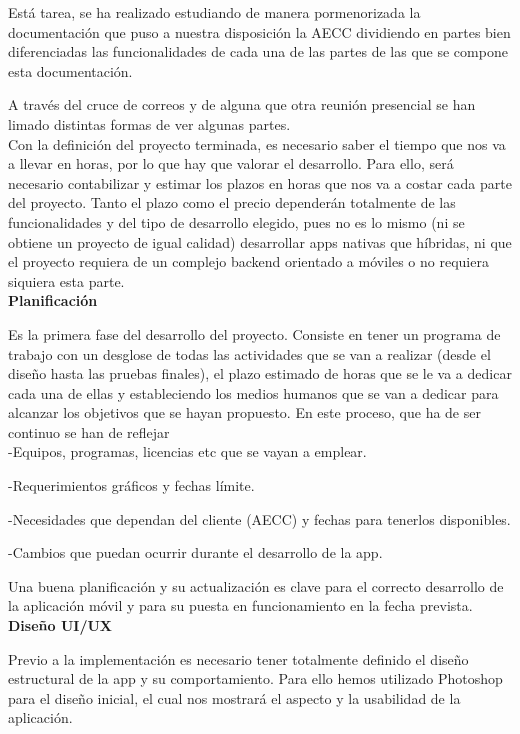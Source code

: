 \documentclass[../pfc.tex]{subfiles}
\begin{document}
	Está tarea, se ha realizado estudiando de manera pormenorizada la documentación que puso a nuestra disposición la AECC dividiendo en partes bien diferenciadas las funcionalidades de cada una de las partes de las que se compone esta documentación.
	
	A través del cruce de correos y de alguna que otra reunión presencial se han limado distintas formas de ver algunas partes.\\
	
		
	Con la definición del proyecto terminada, es necesario saber el tiempo que nos va a llevar en horas, por lo que hay que valorar el desarrollo. Para ello, será necesario contabilizar y estimar los plazos en horas que nos va a costar cada parte del proyecto. Tanto el plazo como el precio dependerán totalmente de las funcionalidades y del tipo de desarrollo elegido, pues no es lo mismo (ni se obtiene un proyecto de igual calidad) desarrollar apps nativas que híbridas, ni que el proyecto requiera de un complejo backend orientado a móviles o no requiera siquiera esta parte.\\
	
	\textbf{Planificación} 
		
	Es la primera fase del desarrollo del proyecto. Consiste en tener un programa de trabajo con un desglose de todas las actividades que se van a realizar (desde el diseño hasta las pruebas finales), el plazo estimado de horas que se le va a dedicar cada una de ellas y estableciendo los medios humanos que se van a dedicar para alcanzar los objetivos que se hayan propuesto. En este proceso, que ha de ser continuo se han de reflejar\\
	
	-Equipos, programas, licencias etc que se vayan a emplear.
	
	-Requerimientos gráficos y fechas límite.
	
	-Necesidades que dependan del cliente (AECC) y fechas para tenerlos disponibles.
	
	-Cambios que puedan ocurrir durante el desarrollo de la app.
	
	Una buena planificación y su actualización es clave para el correcto desarrollo de la aplicación móvil y para su puesta en funcionamiento en la fecha prevista.\\  
	
	\textbf{Diseño UI/UX}
	
	Previo a la implementación es necesario tener totalmente definido el diseño estructural de la app y su comportamiento. Para ello hemos utilizado Photoshop para el diseño inicial, el cual nos mostrará el aspecto y la usabilidad de la aplicación.
	
\end{document}
